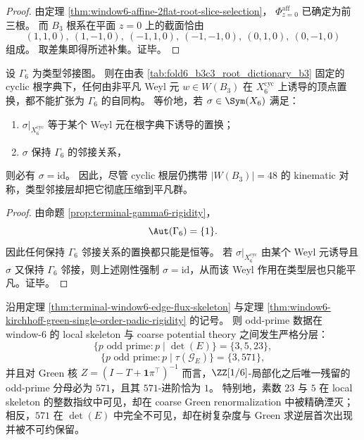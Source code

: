 \begin{proof}
由定理 \ref{thm:window6-affine-2flat-root-slice-selection}，
\(
\Phi_{z=0}^{\mathrm{aff}}
\)
已确定为前三根。
而 \(B_3\) 根系在平面 \(z=0\) 上的截面恰由
\[
(1,1,0),\ (1,-1,0),\ (-1,1,0),\ (-1,-1,0),\ (0,1,0),\ (0,-1,0)
\]
组成。
取差集即得所述补集。证毕。
\end{proof}

\begin{theorem}\label{thm:window6-weyl-symmetry-graph-annihilation}
设 \(\Gamma_6\) 为类型邻接图。
则在由表 \ref{tab:fold6_b3c3_root_dictionary_b3} 固定的 cyclic 根字典下，任何由非平凡 Weyl 元
\(
w\in W(B_3)
\)
在 \(X_6^{\mathrm{cyc}}\) 上诱导的顶点置换，都不能扩张为 \(\Gamma_6\) 的自同构。
等价地，若 \(\sigma\in\Sym(X_6)\) 满足：
\begin{enumerate}
\item \(\sigma|_{X_6^{\mathrm{cyc}}}\) 等于某个 Weyl 元在根字典下诱导的置换；
\item \(\sigma\) 保持 \(\Gamma_6\) 的邻接关系，
\end{enumerate}
则必有 \(\sigma=\mathrm{id}\)。
因此，尽管 cyclic 根层仍携带 \(|W(B_3)|=48\) 的 kinematic 对称，类型邻接层却把它彻底压缩到平凡群。
\end{theorem}

\begin{proof}
由命题 \ref{prop:terminal-gamma6-rigidity}，
\[
\Aut(\Gamma_6)=\{1\}.
\]
因此任何保持 \(\Gamma_6\) 邻接关系的置换都只能是恒等。
若 \(\sigma|_{X_6^{\mathrm{cyc}}}\) 由某个 Weyl 元诱导且 \(\sigma\) 又保持 \(\Gamma_6\) 邻接，则上述刚性强制 \(\sigma=\mathrm{id}\)，从而该 Weyl 作用在类型层也只能平凡。证毕。
\end{proof}

\begin{theorem}\label{thm:window6-local-determinant-vs-coarse-green-odd-primes}
沿用定理 \ref{thm:terminal-window6-edge-flux-skeleton} 与定理 \ref{thm:window6-kirchhoff-green-single-order-padic-rigidity} 的记号。
则 odd-prime 数据在 window-\(6\) 的 local skeleton 与 coarse potential theory 之间发生严格分层：
\[
\{p\text{ odd prime}:p\mid \det(E)\}=\{3,5,23\},
\]
\[
\{p\text{ odd prime}:p\mid \tau(\mathcal G_E)\}=\{3,571\},
\]
并且对 Green 核
\(
Z=(I-T+\mathbf 1\pi^\top)^{-1}
\)
而言，\(\ZZ[1/6]\)-局部化之后唯一残留的 odd-prime 分母必为 \(571\)，且其 \(571\)-进阶恰为 \(1\)。
特别地，素数 \(23\) 与 \(5\) 在 local skeleton 的整数指纹中可见，却在 coarse Green renormalization 中被精确湮灭；相反，\(571\) 在 \(\det(E)\) 中完全不可见，却在树复杂度与 Green 求逆层首次出现并被不可约保留。
\end{theorem}

